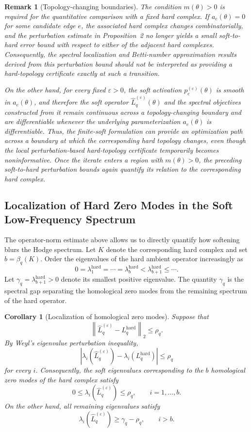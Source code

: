 \documentclass[pdflatex,sn-mathphys-num]{sn-jnl}%
\theoremstyle{thmstyleone}%
\theoremstyle{thmstyletwo}%
\newtheorem{remark}{Remark}%
\newtheorem{corollary}[theorem]{Corollary}
\theoremstyle{thmstylethree}%
\begin{document}
\begin{remark}[Topology-changing boundaries]
The condition $m(\theta)>0$ is required for the quantitative comparison
with a fixed hard complex. If $a_e(\theta)=0$ for some candidate edge
$e$, the associated hard complex changes combinatorially, and the
perturbation estimate in Proposition~2 no longer yields a small
soft-to-hard error bound with respect to either of the adjacent hard
complexes. Consequently, the spectral localization and Betti-number
approximation results derived from this perturbation bound should not be
interpreted as providing a hard-topology certificate exactly at such a
transition.

On the other hand, for every fixed $\varepsilon>0$, the soft activation
$p_e^{(\varepsilon)}(\theta)$ is smooth in $a_e(\theta)$, and therefore
the soft operator $\widehat{L}_q^{(\varepsilon)}(\theta)$ and the
spectral objectives constructed from it remain continuous across a
topology-changing boundary and are differentiable whenever the
underlying parameterization $a_e(\theta)$ is differentiable.
Thus, the finite-soft formulation can provide an optimization path
across a boundary at which the corresponding hard topology changes,
even though the local perturbation-based hard-topology certificate
temporarily becomes noninformative. Once the iterate enters a region
with $m(\theta)>0$, the preceding soft-to-hard perturbation bounds again
quantify its relation to the corresponding hard complex.
\end{remark}


\subsection{Localization of Hard Zero Modes in the Soft Low-Frequency Spectrum}

The operator-norm estimate above allows us to directly quantify how softening blurs the Hodge spectrum.
Let \(K\) denote the corresponding hard complex and set $b=\beta_q(K)$.
Order the eigenvalues of the hard ambient operator increasingly as
\[
0
=
\lambda_1^{\mathrm{hard}}
=
\cdots
=
\lambda_b^{\mathrm{hard}}
<
\lambda_{b+1}^{\mathrm{hard}}
\le
\cdots.
\]
Let
$\gamma_q
=
\lambda_{b+1}^{\mathrm{hard}}
>0$
denote its smallest positive eigenvalue.
The quantity \(\gamma_q\) is the spectral gap separating the homological zero modes from the remaining spectrum of the hard operator.

\begin{corollary}[Localization of homological zero modes]
Suppose that
\[
\left\|
\widehat L_q^{(\varepsilon)}
-
L_q^{\mathrm{hard}}
\right\|_2
\le
\rho_q.
\]
By Weyl's eigenvalue perturbation inequality,
\[
\left|
\lambda_i(\widehat L_q^{(\varepsilon)})
-
\lambda_i(L_q^{\mathrm{hard}})
\right|
\le
\rho_q
\]
for every \(i\).
Consequently, the soft eigenvalues corresponding to the \(b\) homological zero modes of the hard complex satisfy
\[
0
\le
\lambda_i(\widehat L_q^{(\varepsilon)})
\le
\rho_q,
\qquad
i=1,\ldots,b.
\]
On the other hand, all remaining eigenvalues satisfy
\[
\lambda_i(\widehat L_q^{(\varepsilon)})
\ge
\gamma_q-\rho_q,
\qquad
i>b.
\]
\end{corollary}
\end{document}
